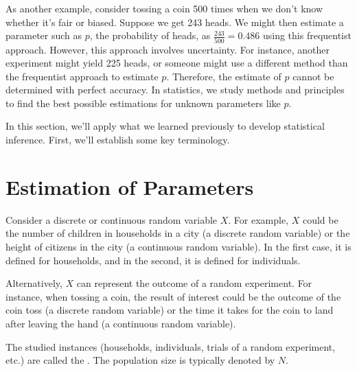 As another example, consider tossing a coin 500 times when we don't know whether it's fair or biased.
Suppose we get 243 heads.
We might then estimate a parameter such as \( p \), the probability of heads, as \( \frac{243}{500} = 0.486 \) using this frequentist approach.
However, this approach involves uncertainty.
For instance, another experiment might yield 225 heads, or someone might use a different method than the frequentist approach to estimate \( p \).
Therefore, the estimate of \( p \) cannot be determined with perfect accuracy.
In statistics, we study methods and principles to find the best possible estimations for unknown parameters like \( p \).

In this section, we'll apply what we learned previously to develop statistical inference.
First, we'll establish some key terminology.

\section{Estimation of Parameters}

Consider a discrete or continuous random variable  \( X \).
For example, \( X \) could be the number of children in households in a city (a discrete random variable) or the height of citizens in the city (a continuous random variable).
In the first case, it is defined for households, and in the second, it is defined for individuals.

Alternatively, \( X \) can represent the outcome of a random experiment.
For instance, when tossing a coin, the result of interest could be the outcome of the coin toss (a discrete random variable) or the time it takes for the coin to land after leaving the hand (a continuous random variable).

The studied instances (households, individuals, trials of a random experiment, etc.) are called the .
The population size is typically denoted by \( N \).